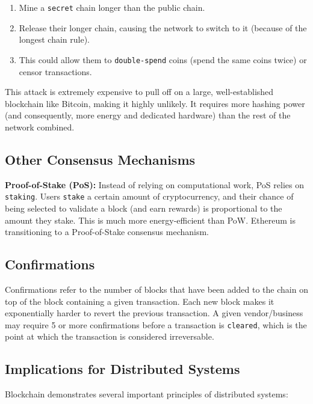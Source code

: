 \begin{enumerate}[itemsep=1pt, topsep=2pt]
    \item Mine a \texttt{secret} chain longer than the public chain.
    \item Release their longer chain, causing the network to switch to it (because of the longest chain rule).
    \item This could allow them to \texttt{double-spend} coins (spend the same coins twice) or censor transactions.
\end{enumerate}

This attack is extremely expensive to pull off on a large, well-established blockchain like Bitcoin, making it highly unlikely. It requires more hashing power (and consequently, more energy and dedicated hardware) than the rest of the network combined.
\subsection{Other Consensus Mechanisms}

\textbf{Proof-of-Stake (PoS):} Instead of relying on computational work, PoS relies on \texttt{staking}. Users \texttt{stake} a certain amount of cryptocurrency, and their chance of being selected to validate a block (and earn rewards) is proportional to the amount they stake. This is much more energy-efficient than PoW. Ethereum is transitioning to a Proof-of-Stake consensus mechanism.

\subsection{Confirmations}
Confirmations refer to the number of blocks that have been added to the chain on top of the block containing a given transaction. Each new block makes it exponentially harder to revert the previous transaction. A given vendor/business may require 5 or more confirmations before a transaction is \texttt{cleared}, which is the point at which the transaction is considered irreversable.

\subsection{Implications for Distributed Systems}
Blockchain demonstrates several important principles of distributed systems:

